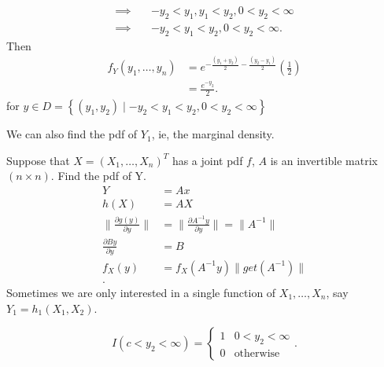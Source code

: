 \begin{example}
\begin{enumerate}
\begin{align*}
				\implies \quad& -y_2 < y_1  , y_1 < y_2 , 0 < y_2  < \infty \\
				\implies \quad& -y_2 < y_1 < y_2, 0 < y_2 < \infty
			.\end{align*}
		Then
		\begin{align*}
			f_{Y}\left( y_{1} , \ldots , y_{n} \right)  &= e^{-\frac{\left( y_1 + y_2  \right)}{2} - \frac{\left( y_2 - y_1 \right) }{2} } \left( \frac{1}{2} \right) \\
			&= \frac{e ^{-y_2}}{2} 
		.\end{align*}
		for $y \in D = \left\{ \left( y_1, y_2  \right)  \mid -y_2 < y_1 < y_2, 0 < y_2 < \infty \right\} $
	\end{enumerate}
	We can also find the pdf of $Y_1$, ie, the marginal density. 
\end{example}
\begin{example}
	Suppose that $X = \left( X_{1} , \ldots , X_{n} \right) ^{T}$ has a joint pdf $f$, $A$ is an invertible matrix $\left( n \times  n \right) $. Find the pdf of Y. 
	\begin{align*}
		Y &= Ax \\
		h\left( X \right)  &=  AX \\
		\|\frac{\partial g\left( y \right) }{\partial y} \| &= \|\frac{\partial A^{-1}y}{\partial y}\| = \|A^{-1}\|  \\
		\frac{\partial By}{\partial y} &= B \\
		f_X\left( y \right) &= f_{X} \left( A^{-1}y \right) \|get\left( A^{-1} \right) \|\\
	.\end{align*}
	Sometimes we are only interested in a  single function of $X_{1} , \ldots , X_{n}$, say $Y_1 = h_1\left( X_1, X_2 \right) $. 
	\begin{note}
		\[
			I\left( c < y_2 < \infty \right) = \begin{cases}
				1 & 0 < y_2 < \infty\\
				0 & \text{otherwise}
			\end{cases}
		.\] 
	\end{note}

\end{example}
 
